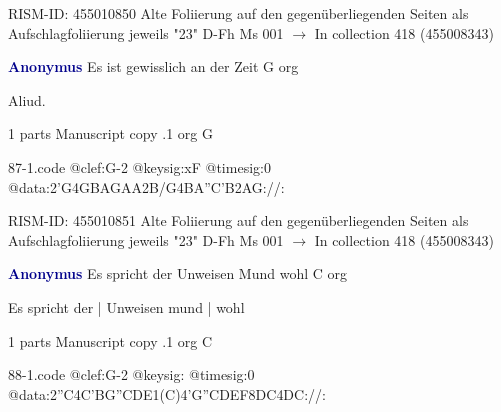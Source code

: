 \documentclass[twocolumn]{book}
\begin{document}
\newline RISM-ID: 455010850
\newline Alte Foliierung auf den gegenüberliegenden Seiten als Aufschlagfoliierung jeweils "23"
\newline D-Fh  Ms 001
\newline $\rightarrow$ In collection 418 (455008343)

\newline \par \vspace{7pt} \textcolor{darkblue}{\textbf{Anonymus  }}
\newline Es ist gewisslich an der Zeit  G  
\newline org
\newline \begin{itshape}[f.22v, at left:] Aliud.\end{itshape} 
\newline \textcolor{darkblue}{}  1 parts  
\newline Manuscript copy
.1  org  G  
\begin{filecontents*}{87-1.code}
@clef:G-2
@keysig:xF
@timesig:0
@data:2'G4GBAGAA2B/G4BA''C'B2AG://:
\end{filecontents*}
\newline
%

\newline RISM-ID: 455010851
\newline Alte Foliierung auf den gegenüberliegenden Seiten als Aufschlagfoliierung jeweils "23"
\newline D-Fh  Ms 001
\newline $\rightarrow$ In collection 418 (455008343)

\newline \par \vspace{7pt} \textcolor{darkblue}{\textbf{Anonymus  }}
\newline Es spricht der Unweisen Mund wohl  C  
\newline org
\newline \begin{itshape}[f.20v, at left:] Es spricht der | Unweisen mund | wohl\end{itshape} 
\newline \textcolor{darkblue}{}  1 parts  
\newline Manuscript copy
.1  org  C  
\begin{filecontents*}{88-1.code}
@clef:G-2
@keysig:
@timesig:0
@data:2''C4C'BG''CDE1(C)4'G''CDEF{8DC}4DC://:
\end{filecontents*}
\newline
%
\end{document}
